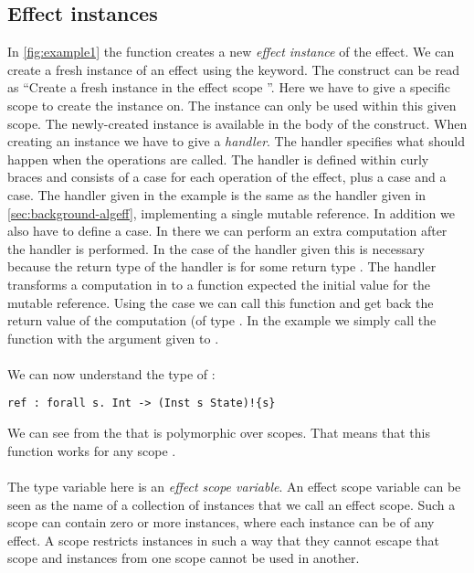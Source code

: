 \subsection{Effect instances}
In \cref{fig:example1} the function  creates a new \emph{effect instance} of the  effect.
We can create a fresh instance of an effect using the  keyword.
The construct  can be read as ``Create a fresh  instance in the effect scope ''.
Here we have to give a specific scope  to create the instance on.
The instance can only be used within this given scope.
The newly-created instance is available in the body of the  construct.
When creating an instance we have to give a \emph{handler}.
The handler specifies what should happen when the operations are called.
The handler is defined within curly braces and consists of a case for each operation of the effect, plus a  case and a  case.
The handler given in the example is the same as the handler given in \cref{sec:background-algeff}, implementing a single mutable reference.
In addition we also have to define a  case.
In there we can perform an extra computation after the handler is performed.
In the case of the handler given this is necessary because the return type of the handler is  for some return type .
The handler transforms a computation in to a function expected the initial value for the mutable reference.
Using the  case we can call this function and get back the return value of the computation (of type .
In the example we simply call the function  with the argument  given to .
\\\\
We can now understand the type of :
\begin{verbatim}
ref : forall s. Int -> (Inst s State)!{s}
\end{verbatim}
We can see from the  that  is polymorphic over scopes.
That means that this function works for any scope .
\\\\
The type variable  here is an \emph{effect scope variable}.
An effect scope variable can be seen as the name of a collection of instances that we call an effect scope.
Such a scope can contain zero or more instances, where each instance can be of any effect.
A scope restricts instances in such a way that they cannot escape that scope and instances from one scope cannot be used in another.

